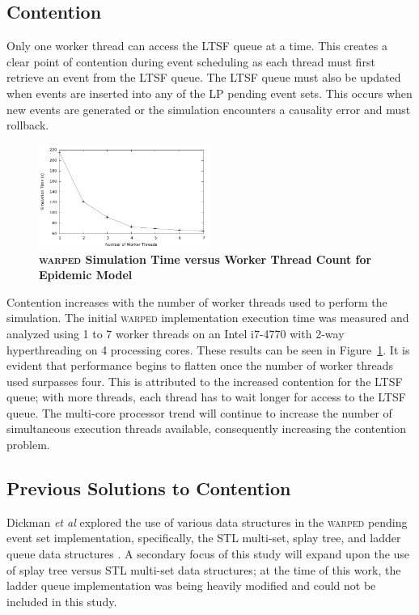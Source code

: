 \documentclass{sig-alternate}
\begin{document}
\subsection{Contention}

Only one worker thread can access the LTSF queue at a time.  This creates a clear point of
contention during event scheduling as each thread must first retrieve an event from the
LTSF queue.  The LTSF queue must also be updated when events are inserted into any of the
LP pending event sets.  This occurs when new events are generated or the simulation
encounters a causality error and must rollback.

\begin{figure}
    \centering
    \graphicspath{ {./figures/} }
    \includegraphics[width=0.5\textwidth,keepaspectratio]{notsx_profile}
    \caption{\textbf{\textsc{warped} Simulation Time versus Worker Thread Count for
        Epidemic Model}}\label{fig:notsx_profile}
\end{figure}

Contention increases with the number of worker threads used to perform the simulation.
The initial \textsc{warped} implementation execution time was measured and analyzed using 1
to 7 worker threads on an Intel i7-4770 with 2-way hyperthreading on 4 processing cores.
These results can be seen in Figure~\ref{fig:notsx_profile}.  It is evident that
performance begins to flatten once the number of worker threads used surpasses four.  This
is attributed to the increased contention for the LTSF queue; with more threads, each
thread has to wait longer for access to the LTSF queue.  The multi-core processor trend
will continue to increase the number of simultaneous execution threads available,
consequently increasing the contention problem.

\subsection{Previous Solutions to Contention}

Dickman \emph{et al} explored the use of various data structures in the
\textsc{warped} pending event set implementation, specifically, the STL multi-set, splay
tree, and ladder queue data structures \cite{dickman}.  A secondary focus of this study
will expand upon the use of splay tree versus STL multi-set data structures; at the time
of this work, the ladder queue implementation was being heavily modified and could not be
included in this study.
\end{document}
